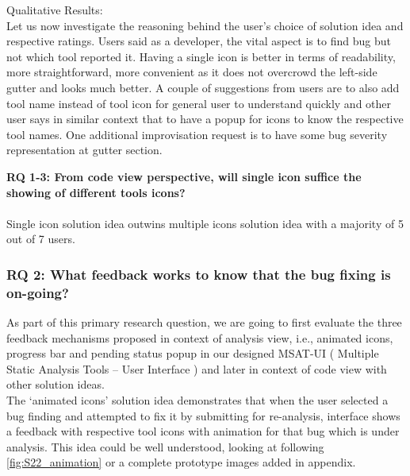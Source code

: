 Qualitative Results: \\

Let us now investigate the reasoning behind the user’s choice of solution idea and respective ratings. Users said as a developer, the vital aspect is to find bug but not which tool reported it. Having a single icon is better in terms of readability, more straightforward, more convenient as it does not overcrowd the left-side gutter and looks much better. A couple of suggestions from users are to also add tool name instead of tool icon for general user to understand quickly and other user says in similar context that to have a popup for icons to know the respective tool names. One additional improvisation request is to have some bug severity representation at gutter section. \\

\begin{myboxi}{{\textbf{RQ 1-3: From code view perspective, will single icon suffice the showing of different tools icons?}}}
\\ \\ Single icon solution idea outwins multiple icons solution idea with a majority of 5 out of 7 users. 
\end{myboxi}


\subsubsection{RQ 2: What feedback works to know that the bug fixing is on-going?}

As part of this primary research question, we are going to first evaluate the three feedback mechanisms proposed in context of analysis view, i.e., animated icons, progress bar and pending status popup in our designed MSAT-UI ( Multiple Static Analysis Tools – User Interface ) and later in context of code view with other solution ideas. \\

The ‘animated icons’ solution idea demonstrates that when the user selected a bug finding and attempted to fix it by submitting for re-analysis, interface shows a feedback with respective tool icons with animation for that bug which is under analysis. This idea could be well understood, looking at following \autoref{fig:S22_animation} or a complete prototype images added in appendix.  \\ \\


